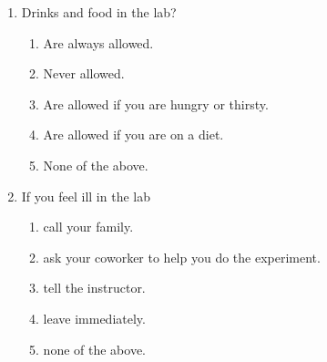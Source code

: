 \documentclass[cover.tex]{subfiles}
\begin{document}
\begin{refsection}
\begin{multicols*}{2}
\begin{enumerate}
\item Drinks and food in the lab?
\begin{enumerate}[label=(\alph*)]
\item Are always allowed.
\item Never allowed.
\item Are allowed if you are hungry or thirsty.
\item Are allowed if you are on a diet.
\item None of the above.
\end{enumerate}

\item If you feel ill in the lab
\begin{enumerate}[label=(\alph*)]
\item call your family.
\item ask your coworker to help you do the experiment.
\item tell the instructor.
\item leave immediately.
\item none of the above.
\end{enumerate}
%
%
%

\end{enumerate}
\end{multicols*}
\end{refsection}
\end{document}
